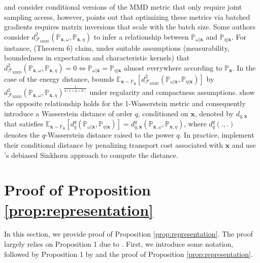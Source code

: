 \citet{ren2016conditional} and \citet{park2020measure} consider conditional versions of the MMD metric that only require joint sampling access,
however, \citet{huang2022evaluating} points out that optimizing these metrics via batched gradients requires matrix inversions that scale with the batch size. Some authors consider $d^2_{\mathcal{F}_\text{MMD}}(\mathbb{P}_{\boldsymbol{x}, \omega}, \mathbb{P}_{\boldsymbol{x}, \eta})$ to infer a relationship between $\mathbb{P}_{\omega|\boldsymbol{x}}$ and $\mathbb{P}_{\eta|\boldsymbol{x}}$. For instance, \citet{huang2022evaluating} (Theorem 6) claim, under suitable assumptions (measurability, boundedness in expectation and characteristic kernels) that $d^2_{\mathcal{F}_\text{MMD}}(\mathbb{P}_{\boldsymbol{x}, \omega}, \mathbb{P}_{\boldsymbol{x}, \eta}) = 0 \iff \mathbb{P}_{\omega|\boldsymbol{x}} = \mathbb{P}_{\eta|\boldsymbol{x}}$ almost everywhere according to $\mathbb{P}_{\boldsymbol{x}}$. In the case of the energy distance, \citet{hagemann2023posterior} bounds $\mathbb{E}_{\boldsymbol{x} \sim \mathbb{P}_{\boldsymbol{x}}} \left[ d^2_{\mathcal{F}_\text{MMD}}\left( \mathbb{P}_{\omega |\boldsymbol{x}}, \mathbb{P}_{\eta |\boldsymbol{x}} \right) \right]$ by $d^2_{\mathcal{F}_\text{MMD}}(\mathbb{P}_{\boldsymbol{x}, \omega}, \mathbb{P}_{\boldsymbol{x}, \eta})^{\frac{1}{4(1+p+d)}}$ under regularity and compactness assumptions. \citet{chemseddine2023diagonal} show the opposite relationship holds for the 1-Wasserstein metric and consequently introduce a Wasserstein distance of order $q$, conditioned on $\boldsymbol{x}$, denoted by $d_{q, \boldsymbol{x}}$ that satisfies $\mathbb{E}_{\boldsymbol{x} \sim \mathbb{P}_{\boldsymbol{x}}} \left[ d_q^q \left( \mathbb{P}_{\omega |\boldsymbol{x}}, \mathbb{P}_{\eta |\boldsymbol{x}} \right) \right] = d_{q, \boldsymbol{x}}^q(\mathbb{P}_{\boldsymbol{x}, \omega}, \mathbb{P}_{\boldsymbol{x}, \eta})$, where $d_q^q(.,.)$ denotes the $q$-Wasserstein distance raised to the power $q$. In practice, \citet{chemseddine2023diagonal} implement their conditional distance by penalizing transport cost associated with $\boldsymbol{x}$ and use \citet{feydy2019interpolating}'s debiased Sinkhorn approach to compute the distance.

\section{Proof of Proposition \ref{prop:representation}}\label{appendx:prop2}
In this section, we provide proof of Proposition \ref{prop:representation}. The proof largely relies on Proposition 1 due to \citet{tabaghi2024universal}. First, we introduce some notation, followed by Proposition 1 by \citet{tabaghi2024universal} and the proof of Proposition \ref{prop:representation}. 

